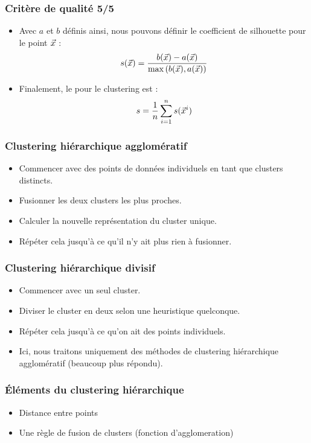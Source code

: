 \begin{frame}
\frametitle{Critère de qualité 5/5}
\begin{itemize}
	\item Avec $a$ et $b$ définis ainsi, nous pouvons définir le coefficient de silhouette pour le point $\vec{x}$ : 
	\begin{equation*}
	s(\vec{x}) = \frac{b(\vec{x})-a(\vec{x}) }{\max{(b(\vec{x}), a(\vec{x}))}  }
	\end{equation*}
	\item Finalement, le  pour le clustering est :
	\begin{equation*}
	s = \frac1n \sum_{i=1}^{n}s(\vec{x}^i)
	\end{equation*}

\end{itemize}
\end{frame}

\begin{frame}
\frametitle{Clustering hiérarchique agglomératif}
\begin{itemize}
\item Commencer avec des points de données individuels en tant que clusters distincts.
\item Fusionner les deux clusters les plus proches.
\item Calculer la nouvelle représentation du cluster unique.
\item Répéter cela jusqu'à ce qu'il n'y ait plus rien à fusionner.
\end{itemize}
\end{frame}

\begin{frame}
\frametitle{Clustering hiérarchique divisif}
\begin{itemize}
\item Commencer avec un seul cluster.
\item Diviser le cluster en deux selon une heuristique quelconque.
\item Répéter cela jusqu'à ce qu'on ait des points individuels.
\item Ici, nous traitons uniquement des méthodes de clustering hiérarchique agglomératif (beaucoup plus répondu). 
\end{itemize}
\end{frame}

\begin{frame}
\frametitle{Éléments du clustering hiérarchique}
\begin{itemize}
\item Distance entre points
\item Une règle de fusion de clusters (fonction d'agglomeration)
\end{itemize}
\end{frame}

